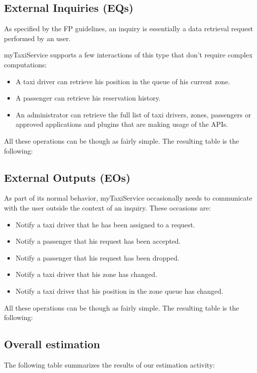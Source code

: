 \subsection{External Inquiries (EQs)}
As specified by the FP guidelines, an inquiry is essentially a data retrieval request performed by an user. 

myTaxiService supports a few interactions of this type that don't require complex computations:
\begin{itemize}
	\item A taxi driver can retrieve his position in the queue of his current zone. 
	\item A passenger can retrieve his reservation history.
	\item An administrator can retrieve the full list of taxi drivers, zones, passengers or approved applications and plugins that are making usage of the APIs.
\end{itemize}

All these operations can be though as fairly simple. The resulting table is the following:
\pagebreak

\subsection{External Outputs (EOs)}
As part of its normal behavior, myTaxiService occasionally needs to communicate with the user outside the context of an inquiry. These occasions are:

\begin{itemize}
	\item Notify a taxi driver that he has been assigned to a request.
	\item Notify a passenger that his request has been accepted.
	\item Notify a passenger that his request has been dropped.
	\item Notify a taxi driver that his zone has changed.
	\item Notify a taxi driver that his position in the zone queue has changed.
\end{itemize}

All these operations can be though as fairly simple. The resulting table is the following:

\subsection{Overall estimation}
The following table summarizes the results of our estimation activity:

